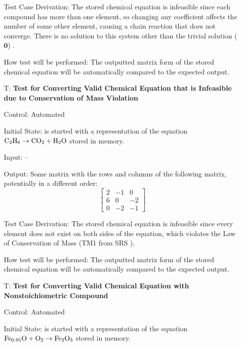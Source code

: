 \documentclass[12pt, titlepage]{article}
\newcounter{testnum} %
\begin{document}
\begin{enumerate}
    Test Case Derivation: The stored chemical equation is infeasible since
    each compound has more than one element, so changing any coefficient
    affects the number of some other element, causing a chain reaction that
    does not converge. There is no solution to this system other than the
    trivial solution ($\mathbf{0}$) \cite{hamid_balancing_2019}.

    How test will be performed: The outputted matrix form of the stored
    chemical equation will be automatically compared to the expected output.

  \item[T\refstepcounter{testnum}\thetestnum \label{test_convert_inf_cons_mass_valid}:]
    \textbf{Test for Converting Valid Chemical Equation that is Infeasible due
      to Conservation of Mass Violation}

    Control: Automated

    Initial State: \progname{} is started with a representation of the equation
    $\ce{C2H6} \rightarrow \ce{CO2} + \ce{H2O}$ stored in memory.

    Input: --

    Output: Some matrix with the rows and columns of the following matrix,
    potentially in a different order:
    $$\begin{bmatrix}
        2 & -1 & 0  \\
        6 & 0  & -2 \\
        0 & -2 & -1
      \end{bmatrix}$$

    Test Case Derivation: The stored chemical equation is infeasible since
    every element does not exist on both sides of the equation, which violates
    the Law of Conservation of Mass (TM1 from SRS ).

    How test will be performed: The outputted matrix form of the stored
    chemical equation will be automatically compared to the expected output.

  \item[T\refstepcounter{testnum}\thetestnum \label{test_convert_nonstoich_valid}:]
    \textbf{Test for Converting Valid Chemical Equation with Nonstoichiometric
      Compound}

    Control: Automated

    Initial State: \progname{} is started with a representation of the equation
    $\ce{Fe_{0.95}O} + \ce{O2} \rightarrow \ce{Fe2O3}$
    \cite{doubtnut_when_nodate} stored in memory.


\end{enumerate}
\end{document}
